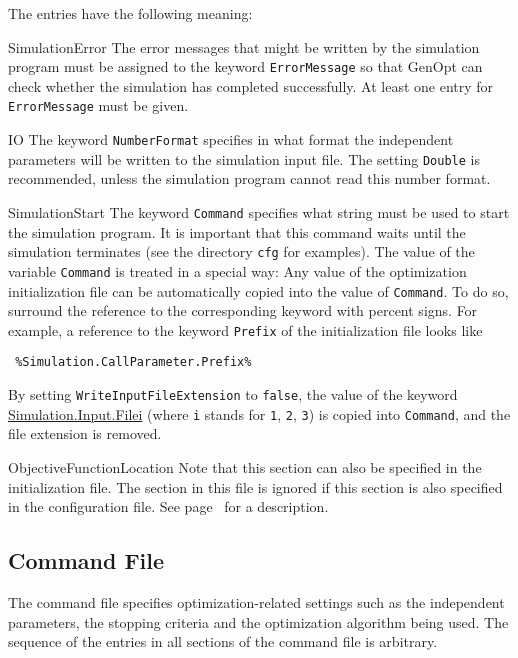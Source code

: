 \noindent The entries have the following meaning:
\begin{codedescription}

\item [SimulationError]
The error messages that might be written by the simulation program must be assigned to the keyword \verb$ErrorMessage$ so that GenOpt can check whether the simulation has completed successfully. At least one entry for \verb$ErrorMessage$ must be given.

\item[IO]
The keyword \verb$NumberFormat$ specifies in what format the independent parameters will be written to the simulation input file. The setting \verb$Double$ is recommended, unless the simulation program cannot read this number format.\\

\item[SimulationStart]
\label{key:com}
The keyword \verb$Command$ specifies what string must be used to start the simulation program.
It is important that this command waits until the simulation terminates 
(see the directory \texttt{cfg} for examples).
The value of the variable \verb$Command$ is treated in a special way: 
Any value of the optimization initialization file can be 
automatically copied into the value of \verb$Command$. 
To do so, surround the reference to the corresponding keyword with percent signs.
For example, a reference to the keyword 
\verb$Prefix$ of the initialization file looks like
\begin{lstlisting}
 %Simulation.CallParameter.Prefix%
\end{lstlisting}

By setting \verb$WriteInputFileExtension$ to \verb$false$, the value of the keyword \url{Simulation.Input.Filei} (where \verb$i$ stands for \verb$1$, \verb$2$, \verb$3$) is copied into \verb$Command$, and the file extension is removed.

\item[ObjectiveFunctionLocation]
Note that this section can also be specified in the initialization file.
The section in this file is ignored if this section is also specified in the 
configuration file.
See page~\pageref{sec:objFunLoc} for a description.
\end{codedescription}

\subsection{Command File}
\label{par:comFil}
The command file specifies optimization-related settings such as 
the independent parameters, 
the stopping criteria and the optimization algorithm being used.
The sequence of the entries in all sections of the command file is arbitrary.\\

